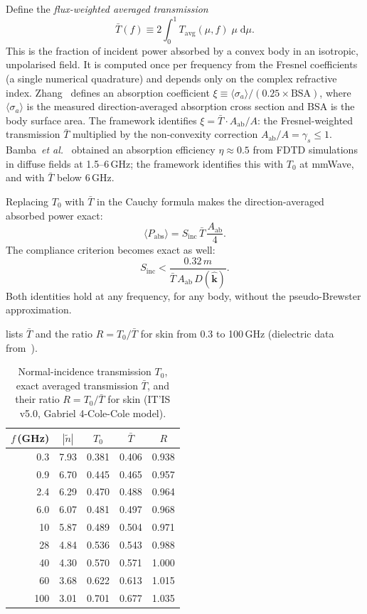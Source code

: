 \documentclass[11pt,a4paper]{article}
\theoremstyle{definition}      %
\newcommand{\khat}{\hat{\bm{k}}}
\newcommand{\Sinc}{S_{\mathrm{inc}}}
\newcommand{\Tavg}{T_{\mathrm{avg}}}
\newcommand{\Aab}{A_{\mathrm{ab}}}
\newcommand{\ntilde}{\tilde{n}}
\newcommand{\Tbar}{\bar{T}}
\newcommand{\diff}{\mathrm{d}}        %
\begin{document}
Define the \emph{flux-weighted averaged transmission}
\begin{equation}\label{eq:Tbar-def}
  \Tbar(f)
  \equiv 2\int_0^1\Tavg(\mu,f)\;\mu\;\diff \mu.
\end{equation}
This is the fraction of incident power absorbed by a convex body
in an isotropic, unpolarised field.  It is computed once per
frequency from the Fresnel coefficients (a single numerical
quadrature) and depends only on the complex refractive index.
Zhang~\cite{Zhang2017thesis,ZhangRobinson2020} defines an absorption coefficient
$\xi\equiv\langle\sigma_a\rangle/(0.25\times\mathrm{BSA})$, where
$\langle\sigma_a\rangle$ is the measured direction-averaged absorption cross section
and BSA is the body surface area.
The framework identifies $\xi = \Tbar\cdot\Aab/A$: the
Fresnel-weighted transmission $\Tbar$ multiplied by the non-convexity
correction $\Aab/A = \gamma_s\le 1$.
Bamba~\textit{et al.}~\cite{Bamba2014} obtained an absorption efficiency
$\eta\approx 0.5$ from FDTD simulations in diffuse fields at 1.5--6\,GHz;
the framework identifies this with $T_0$ at mmWave, and with $\Tbar$ below
6\,GHz.

Replacing $T_0$ with $\Tbar$ in the Cauchy formula makes the
direction-averaged absorbed power exact:
\begin{equation}\label{eq:Cauchy-exact}
  \boxed{\langle P_{\mathrm{abs}}\rangle
    = \Sinc\,\Tbar\,\frac{\Aab}{4}.}
\end{equation}
The compliance criterion becomes exact as well:
\begin{equation}\label{eq:compliance-exact}
  \Sinc < \frac{0.32\,m}{\Tbar\,\Aab\,D(\khat)}.
\end{equation}
Both identities hold at any frequency, for any body, without the
pseudo-Brewster approximation.

 lists $\Tbar$ and the ratio $R=T_0/\Tbar$ for
skin from 0.3 to 100\,GHz (dielectric data
from~\cite{Gabriel1996,ITISv5}).

\begin{table}[!htbp]
\centering
\caption{Normal-incidence transmission $T_0$, exact averaged
  transmission $\Tbar$, and their ratio $R=T_0/\Tbar$ for skin
  (IT'IS v5.0, Gabriel 4-Cole-Cole model).}\label{tab:Tbar}
\begin{tabular}{rcccc}
\toprule
$f$\,(GHz) & $|\ntilde|$ & $T_0$ & $\Tbar$ & $R$ \\
\midrule
  0.3 & 7.93 & 0.381 & 0.406 & 0.938 \\
  0.9 & 6.70 & 0.445 & 0.465 & 0.957 \\
  2.4 & 6.29 & 0.470 & 0.488 & 0.964 \\
  6.0 & 6.07 & 0.481 & 0.497 & 0.968 \\
 10   & 5.87 & 0.489 & 0.504 & 0.971 \\
 28   & 4.84 & 0.536 & 0.543 & 0.988 \\
 40   & 4.30 & 0.570 & 0.571 & 1.000 \\
 60   & 3.68 & 0.622 & 0.613 & 1.015 \\
100   & 3.01 & 0.701 & 0.677 & 1.035 \\
\bottomrule
\end{tabular}
\end{table}
\end{document}
